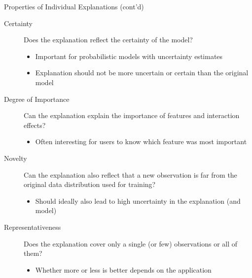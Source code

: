 \documentclass[aspectratio=169]{../latex_main/tntbeamer}  %
\begin{document}
\begin{frame}[c]{Properties of Individual Explanations (cont'd)~}
	
	\begin{description}
        \item[Certainty] Does the explanation reflect the certainty of the model?
        \begin{itemize}
            \item Important for probabilistic models with uncertainty estimates
            \item Explanation should not be more uncertain or certain than the original model
        \end{itemize}
        \medskip
        \pause
        \item[Degree of Importance] Can the explanation explain the importance of features and interaction effects?
        \begin{itemize}
            \item Often interesting for users to know which feature was most important
        \end{itemize}
        \medskip
        \pause
        \item[Novelty] Can the explanation also reflect that a new observation is far from the original data distribution used for training?
        \begin{itemize}
            \item Should ideally also lead to high uncertainty in the explanation (and model)
        \end{itemize}
        \pause
        \item[Representativeness] Does the explanation cover only a single (or few) observations or all of them?
        \begin{itemize}
            \item Whether more or less is better depends on the application
        \end{itemize}
        
	\end{description}
\end{frame}
	
\end{document}
